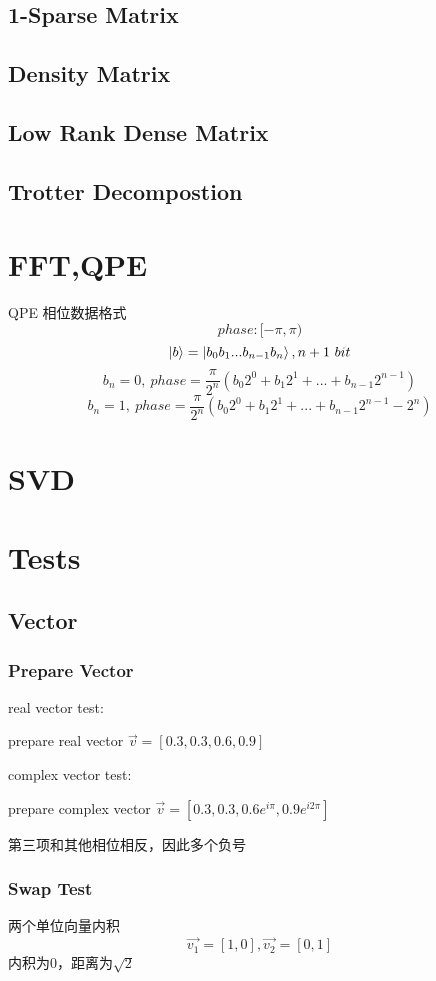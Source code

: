 \documentclass{article}
\begin{document}
\subsection{1-Sparse Matrix}
\subsection{Density Matrix}
\subsection{Low Rank Dense Matrix}
\subsection{Trotter Decompostion}

\section{FFT,QPE}
QPE 相位数据格式
	$$phase:[-\pi,\pi)$$
	$$ \ket{b} = \ket{b_0b_1...b_{n-1}b_n}, n+1\ bit$$
	$$b_n =0,	\  phase= \frac{\pi}{2^{n}} (b_0 2^0 + b_1 2^1+ ... + b_{n-1} 2^{n-1})  $$
    $$b_n =1,	\  phase= \frac{\pi}{2^{n}} (b_0 2^0 + b_1 2^1+ ... + b_{n-1} 2^{n-1}-2^{n})  $$

\section{SVD}
\section{Tests}
\subsection{Vector}
\subsubsection{Prepare Vector}
real vector test:

	prepare real vector  $ \vec{v} = [ 0.3, 0.3, 0.6, 0.9] $
	
complex vector test:

	prepare complex vector  $ \vec{v} = [ 0.3, 0.3, 0.6e^{i\pi}, 0.9e^{i2\pi}] $
	
	第三项和其他相位相反，因此多个负号

\subsubsection{Swap Test}
	两个单位向量内积
	$$\vec{v_1} = [1,0], \vec{v_2} = [0,1] $$
	内积为0，距离为$\sqrt{2}$
\end{document}
